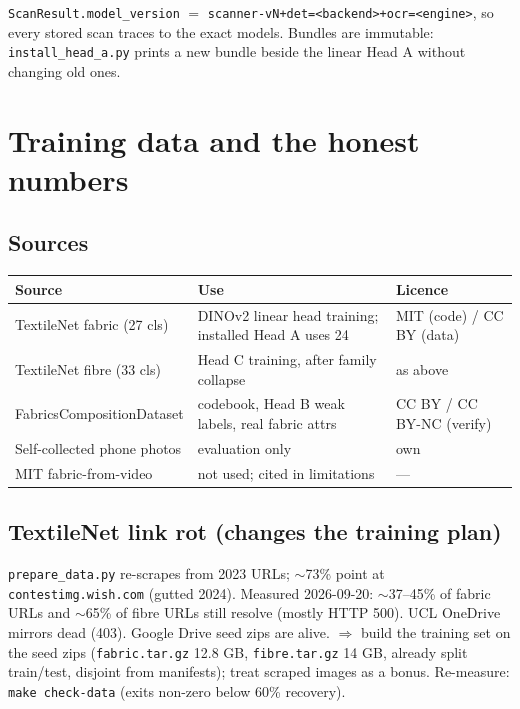 \documentclass[11pt,a4paper]{article}
\begin{document}
\texttt{ScanResult.model\_version} $=$ \texttt{scanner-vN+det=<backend>+ocr=<engine>},
so every stored scan traces to the exact models. Bundles are immutable:
\texttt{install\_head\_a.py} prints a new bundle beside the linear Head A without
changing old ones.

\section{Training data and the honest numbers}

\subsection{Sources}

\begin{table}[h]
\centering
\begin{tabular}{lll}
\toprule
Source & Use & Licence \\
\midrule
TextileNet fabric (27 cls) & DINOv2 linear head training; installed Head A uses 24 & MIT (code) / CC BY (data) \\
TextileNet fibre (33 cls) & Head C training, after family collapse & as above \\
FabricsCompositionDataset & codebook, Head B weak labels, real fabric attrs & CC BY / CC BY-NC (verify) \\
Self-collected phone photos & evaluation only & own \\
MIT fabric-from-video & not used; cited in limitations & --- \\
\bottomrule
\end{tabular}
\end{table}

\subsection{TextileNet link rot (changes the training plan)}

\texttt{prepare\_data.py} re-scrapes from 2023 URLs; $\sim$73\% point at
\texttt{contestimg.wish.com} (gutted 2024). Measured 2026-09-20: $\sim$37--45\%
of fabric URLs and $\sim$65\% of fibre URLs still resolve (mostly HTTP 500). UCL
OneDrive mirrors dead (403). Google Drive seed zips are alive. $\Rightarrow$ build
the training set on the seed zips (\texttt{fabric.tar.gz} 12.8 GB,
\texttt{fibre.tar.gz} 14 GB, already split train/test, disjoint from manifests);
treat scraped images as a bonus. Re-measure: \texttt{make check-data} (exits
non-zero below 60\% recovery).
\end{document}
